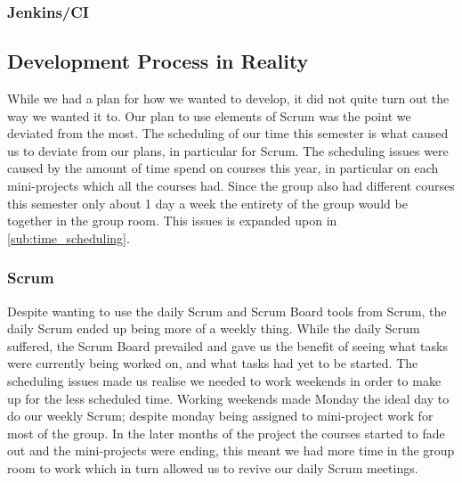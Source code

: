 \subsubsection{Jenkins/CI}
\subsection{Development Process in Reality}
While we had a plan for how we wanted to develop, it did not quite turn out the way we wanted it to.
Our plan to use elements of Scrum was the point we deviated from the most.
The scheduling of our time this semester is what caused us to deviate from our plans, in particular for Scrum.
The scheduling issues were caused by the amount of time spend on courses this year, in particular on each mini-projects which all the courses had.
Since the group also had different courses this semester only about 1 day a week the entirety of the group would be together in the group room.
This issues is expanded upon in \cref{sub:time_scheduling}.
\subsubsection{Scrum}
Despite wanting to use the daily Scrum and Scrum Board tools from Scrum, the daily Scrum ended up being more of a weekly thing.
While the daily Scrum suffered, the Scrum Board prevailed and gave us the benefit of seeing what tasks were currently being worked on, and what tasks had yet to be started.
The scheduling issues made us realise we needed to work weekends in order to make up for the less scheduled time.
Working weekends made Monday the ideal day to do our weekly Scrum; despite monday being assigned to mini-project work for most of the group.
In the later months of the project the courses started to fade out and the mini-projects were ending, this meant we had more time in the group room to work which in turn allowed us to revive our daily Scrum meetings.
